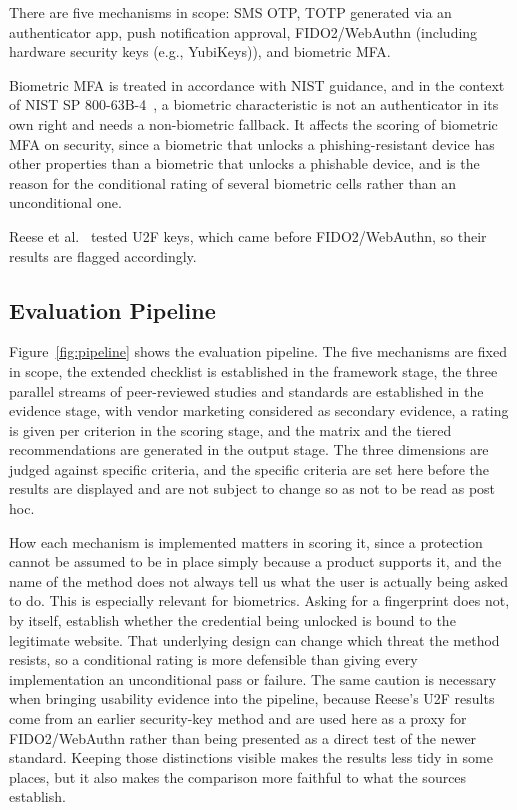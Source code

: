 \documentclass[sigconf]{acmart}
\begin{document}
There are five mechanisms in scope: SMS OTP, TOTP generated via an authenticator app, push notification
approval, FIDO2/WebAuthn (including hardware security keys (e.g., YubiKeys)), and biometric MFA.

Biometric MFA is treated in accordance with NIST guidance, and in the context of NIST SP
800-63B-4~\cite{nist:2025:sp80063b4}, a biometric characteristic is not an authenticator in its own
right and needs a non-biometric fallback. It affects the scoring of biometric MFA on security, since
a biometric that unlocks a phishing-resistant device has other properties than a biometric that
unlocks a phishable device, and is the reason for the conditional rating of several biometric cells
rather than an unconditional one.

Reese et al.~\cite{reese:2019:2fa} tested U2F keys, which came before FIDO2/WebAuthn, so their results are flagged accordingly.

\subsection{Evaluation Pipeline}

Figure~\ref{fig:pipeline} shows the evaluation pipeline. The five mechanisms are fixed in scope, the
extended checklist is established in the framework stage, the three parallel streams of
peer-reviewed studies and standards are established in the evidence stage, with vendor marketing
considered as secondary evidence, a rating is given per criterion in the scoring stage, and the
matrix and the tiered recommendations are generated in the output stage. The three dimensions are
judged against specific criteria, and the specific criteria are set here before the results are
displayed and are not subject to change so as not to be read as post hoc.

How each mechanism is implemented matters in scoring it, since a protection cannot be assumed to be in place simply because a product supports it, and the name of the method does not always tell us what the user is actually being asked to do. This is especially relevant for biometrics. Asking for a fingerprint does not, by itself, establish whether the credential being unlocked is bound to the legitimate website. That underlying design can change which threat the method resists, so a conditional rating is more defensible than giving every implementation an unconditional pass or failure. The same caution is necessary when bringing usability evidence into the pipeline, because Reese's U2F results come from an earlier security-key method and are used here as a proxy for FIDO2/WebAuthn rather than being presented as a direct test of the newer standard. Keeping those distinctions visible makes the results less tidy in some places, but it also makes the comparison more faithful to what the sources establish.
\end{document}

